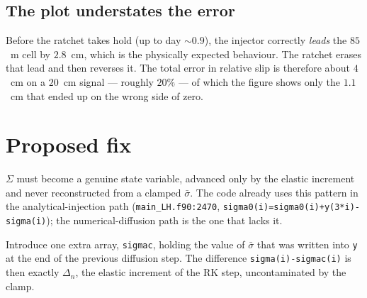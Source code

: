 \documentclass[11pt]{article}
\newcommand{\code}[1]{\texttt{#1}}
\newcommand{\sigeff}{\bar{\sigma}}
\newcommand{\sigtot}{\Sigma}
\begin{document}
\subsection{The plot understates the error}

Before the ratchet takes hold (up to day ${\sim}0.9$), the injector correctly
\emph{leads} the $85$~m cell by $2.8$~cm, which is the physically expected
behaviour. The ratchet erases that lead and then reverses it. The total error
in relative slip is therefore about $4$~cm on a $20$~cm signal --- roughly
$20\%$ --- of which the figure shows only the $1.1$~cm that ended up on the
wrong side of zero.

\section{Proposed fix}
\label{sec:fix}

$\sigtot$ must become a genuine state variable, advanced only by the elastic
increment and never reconstructed from a clamped $\sigeff$. The code already
uses this pattern in the analytical-injection path
(\code{main\_LH.f90:2470}, \code{sigma0(i)=sigma0(i)+y(3*i)-sigma(i)}); the
numerical-diffusion path is the one that lacks it.

Introduce one extra array, \code{sigmac}, holding the value of $\sigeff$ that
was written into \code{y} at the end of the previous diffusion step. The
difference \code{sigma(i)-sigmac(i)} is then exactly $\Delta_n$, the elastic
increment of the RK step, uncontaminated by the clamp.
\end{document}
